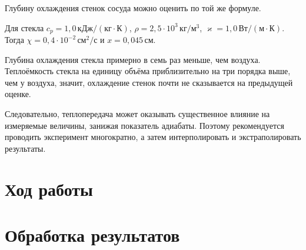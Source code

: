 \documentclass[12pt]{article}
\begin{document}
	 Глубину охлаждения стенок сосуда можно оценить по той же формуле.
	
	Для стекла $c_p=1{,}0\,\text{кДж}/\left( \text{кг} \cdot \text{К} \right)$, $\rho=2{,}5\cdot 10^3 \,\text{кг}/\text{м}^3$, $\varkappa=1{,}0 \,\text{Вт}/\left( \text{м} \cdot \text{К} \right)$. Тогда $\chi=0{,}4\cdot 10^{-2} \,\text{см}^2/\text{с}$ и $x=0{,}045\,\text{см}$.
	
	Глубина охлаждения стекла примерно в семь раз меньше, чем воздуха. Теплоёмкость стекла на единицу объёма приблизительно на три порядка выше, чем у воздуха, значит, охлаждение стенок почти не сказывается на предыдущей оценке.
	
	Следовательно, теплопередача может оказывать существенное влияние на измеряемые величины, занижая показатель адиабаты. Поэтому рекомендуется проводить эксперимент многократно, а затем интерполировать и экстраполировать результаты.
	
	\section*{Ход работы}
	
	\section*{Обработка результатов}
\end{document}
